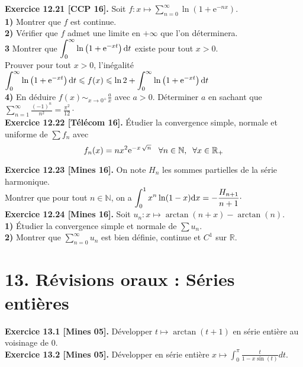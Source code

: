 \documentclass[a4paper,12pt,francais]{article}
\newcommand{\field}[1]{\mathbb{#1}}
\newcommand{\N}{\field{N}}
\newcommand{\R}{\field{R}}
\newcommand{\e}{\mbox{e}}
\begin{document}
\noindent
{\bf Exercice 12.21 [CCP 16].} Soit 
$\displaystyle f: x \mapsto \sum_{n=0}^\infty  \ln \left(1+\e^{-nx} \right)$.\\
{\bf 1)} Montrer que $f$ est continue.\\
{\bf 2)} Vérifier que $f$ admet une limite en $+\infty$ que l'on déterminera.\\
{\bf 3} Montrer que $\displaystyle \int_0^\infty \ln \left( 1+\e^{-xt} \right) {\rm d}t$ existe pour tout $x>0$.\\
Prouver pour tout $x>0$, l'inégalité
$ \displaystyle \int_0^\infty \ln \left( 1+\e^{-xt} \right) {\rm d}t \leqslant f(x) \leqslant \ln 2 +\int_0^\infty \ln \left( 1+\e^{-xt} \right) {\rm d}t$\\
{\bf 4)} En déduire $\displaystyle f(x) \sim_{x \to 0^+} \frac{a}{x}$ avec $a>0$.
Déterminer $a$ en sachant que $\displaystyle \sum_{n=1}^\infty \frac{(-1)^n}{n^2}= \frac{\pi^2}{12} \cdot$\\

\noindent
{\bf Exercice 12.22 [Télécom 16].} %
\'Etudier la convergence simple, normale et uniforme de $\sum f_n$ avec 
$$f_n(x)= n x^2 {\rm e}^{-x \, \sqrt{n}} \;\; \;  \forall n \in \N, \; \;  \forall x\in \R_+$$

\noindent
{\bf Exercice 12.23 [Mines 16].} %
On note $H_n$ les sommes partielles de la série harmonique.\\
Montrer que pour tout $n \in \N$, on a  $\displaystyle \int_0^1 x^n \ln(1-x) {\rm d}x = - \frac{H_{n+1}}{n+1}\cdot$\\

\noindent
{\bf Exercice 12.24 [Mines 16].} %
Soit $u_n : x\mapsto \arctan(n+x)-\arctan(n)$.\\
{\bf 1)} \'Etudier la convergence simple et normale de $\sum u_n$.\\
{\bf 2)} Montrer que $\displaystyle \sum_{n=0}^\infty u_n$ est bien définie, continue et $C^1$ sur $\R$.\\


\newpage
\section*{13. Révisions oraux : Séries entières} %

\noindent
{\bf Exercice 13.1 [Mines 05].} Développer $t \mapsto \arctan (t+1)$ en série entière au voisinage
de $0$.\\

\noindent
{\bf Exercice 13.2 [Mines 05].} Développer en série entière
$\displaystyle x\mapsto
\int_0^\pi \frac{t}{1-x\sin(t)} dt.$\\
\end{document}
